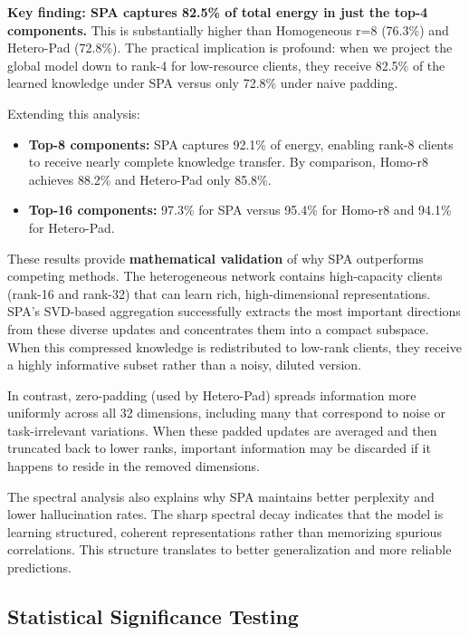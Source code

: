 \documentclass[conference]{IEEEtran}
\begin{document}
\textbf{Key finding: SPA captures 82.5\% of total energy in just the top-4 components.} This is substantially higher than Homogeneous r=8 (76.3\%) and Hetero-Pad (72.8\%). The practical implication is profound: when we project the global model down to rank-4 for low-resource clients, they receive 82.5\% of the learned knowledge under SPA versus only 72.8\% under naive padding.

Extending this analysis:
\begin{itemize}
    \item \textbf{Top-8 components:} SPA captures 92.1\% of energy, enabling rank-8 clients to receive nearly complete knowledge transfer. By comparison, Homo-r8 achieves 88.2\% and Hetero-Pad only 85.8\%.
    
    \item \textbf{Top-16 components:} 97.3\% for SPA versus 95.4\% for Homo-r8 and 94.1\% for Hetero-Pad.
\end{itemize}

These results provide \textbf{mathematical validation} of why SPA outperforms competing methods. The heterogeneous network contains high-capacity clients (rank-16 and rank-32) that can learn rich, high-dimensional representations. SPA's SVD-based aggregation successfully extracts the most important directions from these diverse updates and concentrates them into a compact subspace. When this compressed knowledge is redistributed to low-rank clients, they receive a highly informative subset rather than a noisy, diluted version.

In contrast, zero-padding (used by Hetero-Pad) spreads information more uniformly across all 32 dimensions, including many that correspond to noise or task-irrelevant variations. When these padded updates are averaged and then truncated back to lower ranks, important information may be discarded if it happens to reside in the removed dimensions.

The spectral analysis also explains why SPA maintains better perplexity and lower hallucination rates. The sharp spectral decay indicates that the model is learning structured, coherent representations rather than memorizing spurious correlations. This structure translates to better generalization and more reliable predictions.

\subsection{Statistical Significance Testing}
\end{document}
